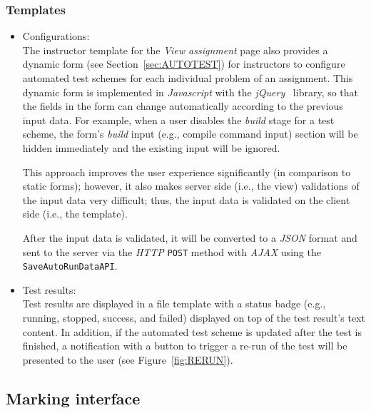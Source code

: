 \subsubsection{Templates}
\begin{itemize}
    \item Configurations: \\
    The instructor template for the \emph{View assignment} page also provides
    a dynamic form (see Section~\ref{sec:AUTOTEST}) for instructors to
    configure automated test schemes for
    each individual problem of an assignment. 
    This dynamic form is implemented in \emph{Javascript} with the
    \emph{jQuery}~\cite{jQuery} library, so that the fields in the form can
    change automatically according to the previous input data.
    For example, when a user disables the \emph{build} stage for a test scheme,
    the form's \emph{build} input (e.g., compile command input) section will
    be hidden immediately and the existing input will be ignored.

    This approach improves the user experience significantly (in comparison to
    static forms); however, it also makes server side (i.e., the view)
    validations of the
    input data very difficult; thus, the input data is validated on the
    client side (i.e., the template).

    After the input data is validated, it will be converted to a \emph{JSON}
    format and sent to the server via the \emph{HTTP} \texttt{POST} method
    with \emph{AJAX} using the \texttt{SaveAutoRunDataAPI}.

    \item Test results: \\
    Test results are displayed in a file template with a status badge
    (e.g., running, stopped, success, and failed)
    displayed on top of the test result's text content.
    In addition, if the automated test scheme is updated after the test
    is finished, a notification with a button to trigger a re-run
    of the test will be presented to the user (see Figure~\ref{fig:RERUN}).
\end{itemize}

\FloatBarrier





\subsection{Marking interface}

